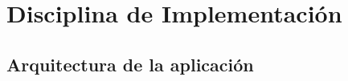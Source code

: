 
\chapter{Disciplina de Implementación}
\label{chap:implementacion}

\section{Arquitectura de la aplicación}


